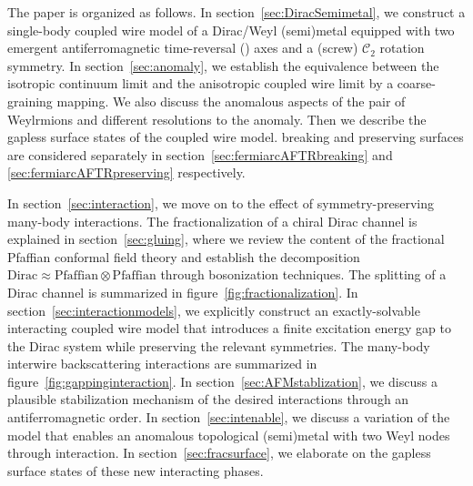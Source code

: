 The paper is organized as follows. In section~\ref{sec:DiracSemimetal}, we construct a single-body coupled wire model of a Dirac/Weyl (semi)metal equipped with two emergent antiferromagnetic time-reversal (\AFTR) axes and a (screw) $\mathcal{C}_2$ rotation symmetry. In section~\ref{sec:anomaly}, we establish the equivalence between the isotropic continuum limit and the anisotropic coupled wire limit by a coarse-graining mapping. We also discuss the anomalous aspects of the pair of Weylrmions and different resolutions to the anomaly. Then we describe the gapless surface states of the coupled wire model. \AFTR breaking and preserving surfaces are considered separately in section~\ref{sec:fermiarcAFTRbreaking} and \ref{sec:fermiarcAFTRpreserving} respectively.

In section~\ref{sec:interaction}, we move on to the effect of symmetry-preserving many-body interactions. The fractionalization of a chiral Dirac channel is explained in section~\ref{sec:gluing}, where we review the content of the fractional Pfaffian conformal field theory and establish the decomposition $\mathrm{Dirac}\approx\mathrm{Pfaffian}\otimes\mathrm{Pfaffian}$ through bosonization techniques. The splitting of a Dirac channel is summarized in figure~\ref{fig:fractionalization}. In section~\ref{sec:interactionmodels}, we explicitly construct an exactly-solvable interacting coupled wire model that introduces a finite excitation energy gap to the Dirac system while preserving the relevant symmetries. The many-body interwire backscattering interactions are summarized in figure~\ref{fig:gappinginteraction}. In section~\ref{sec:AFMstablization}, we discuss a plausible stabilization mechanism of the desired interactions through an antiferromagnetic order. In section~\ref{sec:intenable}, we discuss a variation of the model that enables an anomalous topological (semi)metal with two Weyl nodes through interaction. In section~\ref{sec:fracsurface}, we elaborate on the gapless surface states of these new interacting phases.


